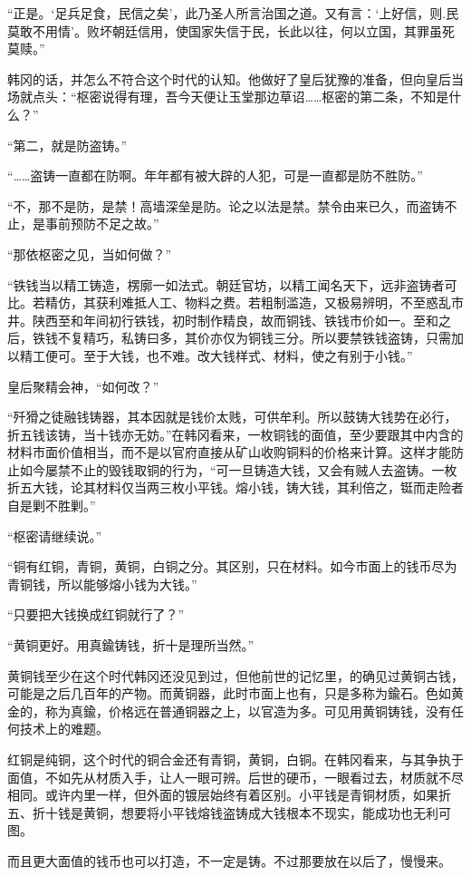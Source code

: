 “正是。‘足兵足食，民信之矣’，此乃圣人所言治国之道。又有言：‘上好信，则.民莫敢不用情’。败坏朝廷信用，使国家失信于民，长此以往，何以立国，其罪虽死莫赎。”

韩冈的话，并怎么不符合这个时代的认知。他做好了皇后犹豫的准备，但向皇后当场就点头：“枢密说得有理，吾今天便让玉堂那边草诏……枢密的第二条，不知是什么？”

“第二，就是防盗铸。”

“……盗铸一直都在防啊。年年都有被大辟的人犯，可是一直都是防不胜防。”

“不，那不是防，是禁！高墙深垒是防。论之以法是禁。禁令由来已久，而盗铸不止，是事前预防不足之故。”

“那依枢密之见，当如何做？”

“铁钱当以精工铸造，楞廓一如法式。朝廷官坊，以精工闻名天下，远非盗铸者可比。若精仿，其获利难抵人工、物料之费。若粗制滥造，又极易辨明，不至惑乱市井。陕西至和年间初行铁钱，初时制作精良，故而铜钱、铁钱市价如一。至和之后，铁钱不复精巧，私铸曰多，其价亦仅为铜钱三分。所以要禁铁钱盗铸，只需加以精工便可。至于大钱，也不难。改大钱样式、材料，使之有别于小钱。”

皇后聚精会神，“如何改？”

“歼猾之徒融钱铸器，其本因就是钱价太贱，可供牟利。所以鼓铸大钱势在必行，折五钱该铸，当十钱亦无妨。”在韩冈看来，一枚铜钱的面值，至少要跟其中内含的材料市面价值相当，而不是以官府直接从矿山收购铜料的价格来计算。这样才能防止如今屡禁不止的毁钱取铜的行为，“可一旦铸造大钱，又会有贼人去盗铸。一枚折五大钱，论其材料仅当两三枚小平钱。熔小钱，铸大钱，其利倍之，铤而走险者自是剿不胜剿。”

“枢密请继续说。”

“铜有红铜，青铜，黄铜，白铜之分。其区别，只在材料。如今市面上的钱币尽为青铜钱，所以能够熔小钱为大钱。”

“只要把大钱换成红铜就行了？”

“黄铜更好。用真鍮铸钱，折十是理所当然。”

黄铜钱至少在这个时代韩冈还没见到过，但他前世的记忆里，的确见过黄铜古钱，可能是之后几百年的产物。而黄铜器，此时市面上也有，只是多称为鍮石。色如黄金的，称为真鍮，价格远在普通铜器之上，以官造为多。可见用黄铜铸钱，没有任何技术上的难题。

红铜是纯铜，这个时代的铜合金还有青铜，黄铜，白铜。在韩冈看来，与其争执于面值，不如先从材质入手，让人一眼可辨。后世的硬币，一眼看过去，材质就不尽相同。或许内里一样，但外面的镀层始终有着区别。小平钱是青铜材质，如果折五、折十钱是黄铜，想要将小平钱熔钱盗铸成大钱根本不现实，能成功也无利可图。

而且更大面值的钱币也可以打造，不一定是铸。不过那要放在以后了，慢慢来。

